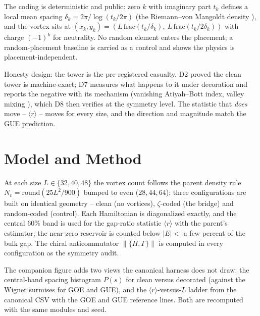 \documentclass[11pt,a4paper]{article}
\begin{document}
The coding is deterministic and public: zero $k$ with imaginary part $t_k$ defines a local mean spacing $\delta_k = 2\pi/\log(t_k/2\pi)$ (the Riemann--von Mangoldt density \cite{riemannvm}), and the vortex sits at $(x_k, y_k) = (L\,\mathrm{frac}(t_k/\delta_k),\ L\,\mathrm{frac}(t_k/2\delta_k))$ with charge $(-1)^k$ for neutrality. No random element enters the placement; a random-placement baseline is carried as a control and shows the physics is placement-independent.

Honesty design: the tower is the pre-registered casualty. D2 proved the clean tower is machine-exact; D7 measures what happens to it under decoration and reports the negative with its mechanism (vanishing Atiyah--Bott index, valley mixing \cite{atyahbott}), which D8 then verifies at the symmetry level. The statistic that \emph{does} move -- $\langle r\rangle$ -- moves for every size, and the direction and magnitude match the GUE prediction.

\section{Model and Method}
At each size $L \in \{32, 40, 48\}$ the vortex count follows the parent density rule $N_v = \mathrm{round}(25L^2/900)$ bumped to even ($28, 44, 64$); three configurations are built on identical geometry -- clean (no vortices), $\zeta$-coded (the bridge) and random-coded (control). Each Hamiltonian is diagonalized exactly, and the central 60\% band is used for the gap-ratio statistic $\langle r\rangle$ with the parent's estimator; the near-zero reservoir is counted below $|E| < $ a few percent of the bulk gap. The chiral anticommutator $\|\{H,\Gamma\}\|$ is computed in every configuration as the symmetry audit.

The companion figure adds two views the canonical harness does not draw: the central-band spacing histogram $P(s)$ for clean versus decorated (against the Wigner surmises for GOE and GUE), and the $\langle r\rangle$-versus-$L$ ladder from the canonical CSV with the GOE and GUE reference lines. Both are recomputed with the same modules and seed.
\end{document}
